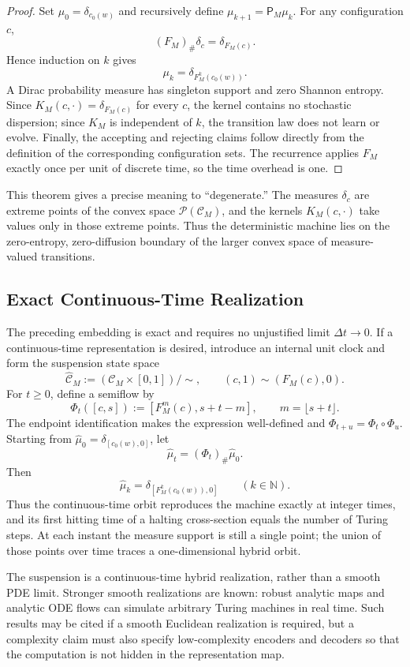 \begin{proof}
 Set $\mu_0=\delta_{c_0(w)}$ and recursively define
 $\mu_{k+1}=\mathsf P_M\mu_k$.  For any configuration $c$,
 \[
   (F_M)_{\#}\delta_c=\delta_{F_M(c)}.
 \]
 Hence induction on $k$ gives
 \[
   \mu_k=\delta_{F_M^k(c_0(w))}.
 \]
 A Dirac probability measure has singleton support and zero Shannon entropy.
 Since $K_M(c,\cdot)=\delta_{F_M(c)}$ for every $c$, the kernel contains no
 stochastic dispersion; since $K_M$ is independent of $k$, the transition law
 does not learn or evolve.  Finally, the accepting and rejecting claims follow
 directly from the definition of the corresponding configuration sets.  The
 recurrence applies $F_M$ exactly once per unit of discrete time, so the time
 overhead is one.
\end{proof}

This theorem gives a precise meaning to ``degenerate.''  The measures
$\delta_c$ are extreme points of the convex space $\mathcal P(\mathcal C_M)$,
and the kernels $K_M(c,\cdot)$ take values only in those extreme points.  Thus
the deterministic machine lies on the zero-entropy, zero-diffusion boundary of
the larger convex space of measure-valued transitions.

\subsection{Exact Continuous-Time Realization}

The preceding embedding is exact and requires no unjustified limit
$\Delta t\to0$.  If a continuous-time representation is desired, introduce an
internal unit clock and form the suspension state space
\[
  \widehat{\mathcal C}_M
  :=(\mathcal C_M\times[0,1])/\!\sim,
  \qquad
  (c,1)\sim(F_M(c),0).
\]
For $t\geq0$, define a semiflow by
\[
  \Phi_t([c,s])
  :=[F_M^{m}(c),s+t-m],
  \qquad m=\lfloor s+t\rfloor.
\]
The endpoint identification makes the expression well-defined and
$\Phi_{t+u}=\Phi_t\circ\Phi_u$.  Starting from
$\widehat\mu_0=\delta_{[c_0(w),0]}$, let
\[
  \widehat\mu_t=(\Phi_t)_{\#}\widehat\mu_0.
\]
Then
\[
  \widehat\mu_k=\delta_{[F_M^k(c_0(w)),0]}
  \qquad(k\in\mathbb N).
\]
Thus the continuous-time orbit reproduces the machine exactly at integer
times, and its first hitting time of a halting cross-section equals the number
of Turing steps.  At each instant the measure support is still a single point;
the union of those points over time traces a one-dimensional hybrid orbit.

The suspension is a continuous-time hybrid realization, rather than a smooth
PDE limit.  Stronger smooth realizations are known: robust analytic maps and
analytic ODE flows can simulate arbitrary Turing machines in real time.  Such
results may be cited if a smooth Euclidean realization is required, but a
complexity claim must also specify low-complexity encoders and decoders so that
the computation is not hidden in the representation map.

